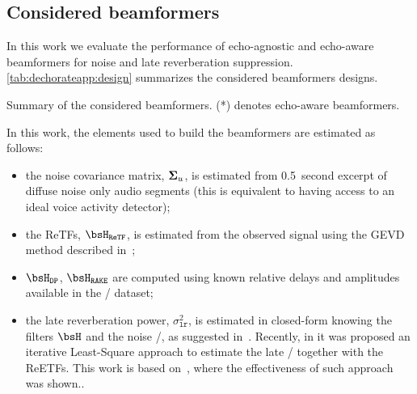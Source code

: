 \subsection{Considered beamformers}
In this work we evaluate the performance of echo-agnostic and echo-aware beamformers for noise and late reverberation suppression.
\cref{tab:dechorateapp:design} summarizes the considered beamformers designs.

\begin{table}[t]
    \begin{fullwidth}

        \centering
        \footnotesize
        
        \caption{Summary of the considered beamformers. (*) denotes echo-aware beamformers.}
        \label{tab:dechorateapp:design}

    \end{fullwidth}
\end{table}

\mynewline
In this work, the elements used to build the beamformers are estimated as follows:
\begin{itemize}
    \item the noise covariance matrix, $\boldsymbol{\Sigma}_{u} $, is estimated from 0.5~second excerpt of diffuse noise only audio segments (this is equivalent to having access to an ideal voice activity detector);
    \item the \acp{ReTF}, $\FLTS_{\mathtt{ReTF}}$, is estimated from the observed signal using the \acf{GEVD} method described in~;
    \item $\FLTS_{\mathtt{DP}}$, $\FLTS_{\mathtt{RAKE}}$ are computed using known relative delays and amplitudes available in the \DECHORATE/ dataset;
    \item the late reverberation power, $\sigma_{\mathtt{lr}}^2$, is estimated in closed-form knowing the filters $\FLTS$ and the noise \PSD/, as suggested in~.
    Recently, in  it was proposed an iterative Least-Square approach to estimate the late \PSD/ together with the \acfp{ReETF}.
    This work is based on~, where the effectiveness of such approach was shown..
\end{itemize}

